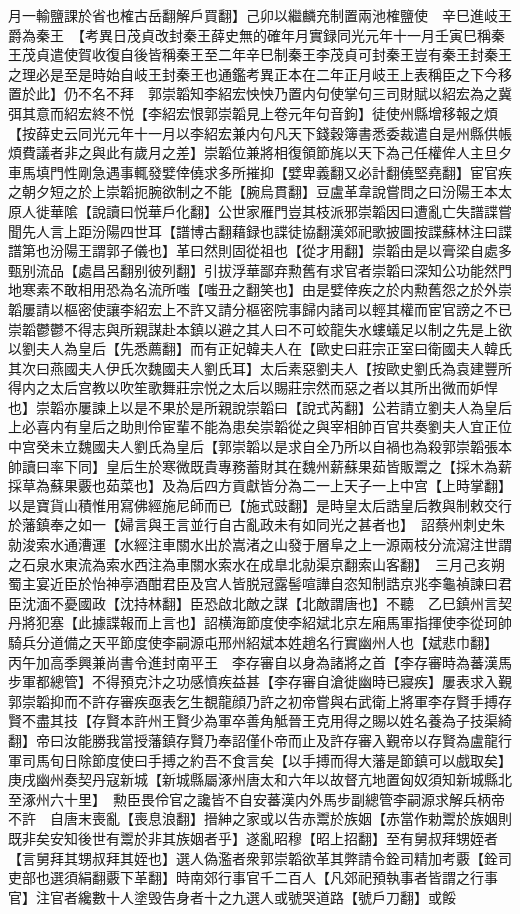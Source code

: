 月一輸鹽課於省也榷古岳翻解戶買翻】己卯以繼麟充制置兩池榷鹽使　辛巳進岐王爵為秦王　【考異日茂貞改封秦王薛史無的確年月實録同光元年十一月壬寅巳稱秦王茂貞遣使賀收復自後皆稱秦王至二年辛巳制秦王李茂貞可封秦王豈有秦王封秦王之理必是至是時始自岐王封秦王也通鑑考異正本在二年正月岐王上表稱臣之下今移置於此】仍不名不拜　郭崇韜知李紹宏怏怏乃置内句使掌句三司財賦以紹宏為之冀弭其意而紹宏終不悦【李紹宏恨郭崇韜見上卷元年句音鉤】徒使州縣增移報之煩【按薛史云同光元年十一月以李紹宏兼内句凡天下錢穀簿書悉委裁遣自是州縣供帳煩費議者非之與此有歲月之差】崇韜位兼將相復領節旄以天下為己任權侔人主旦夕車馬填門性剛急遇事輒發嬖倖僥求多所摧抑【嬖卑義翻又必計翻僥堅堯翻】宦官疾之朝夕短之於上崇韜扼腕欲制之不能【腕烏貫翻】豆盧革韋說嘗問之曰汾陽王本太原人徙華隂【說讀曰悦華戶化翻】公世家雁門豈其枝派邪崇韜因曰遭亂亡失譜諜嘗聞先人言上距汾陽四世耳【譜博古翻藉録也諜徒協翻漢郊祀歌披圖按諜蘇林注曰諜譜第也汾陽王謂郭子儀也】革曰然則固從祖也【從才用翻】崇韜由是以膏梁自處多甄别流品【處昌呂翻别彼列翻】引拔浮華鄙弃勲舊有求官者崇韜曰深知公功能然門地寒素不敢相用恐為名流所嗤【嗤丑之翻笑也】由是嬖倖疾之於内勲舊怨之於外崇韜屢請以樞密使讓李紹宏上不許又請分樞密院事歸内諸司以輕其權而宦官謗之不已崇韜鬱鬱不得志與所親謀赴本鎮以避之其人曰不可蛟龍失水螻蟻足以制之先是上欲以劉夫人為皇后【先悉薦翻】而有正妃韓夫人在【歐史曰莊宗正室曰衛國夫人韓氏其次曰燕國夫人伊氏次魏國夫人劉氏耳】太后素惡劉夫人【按歐史劉氏為袁建豐所得内之太后宫教以吹笙歌舞莊宗悦之太后以賜莊宗然而惡之者以其所出微而妒悍也】崇韜亦屢諫上以是不果於是所親說崇韜曰【說式芮翻】公若請立劉夫人為皇后上必喜内有皇后之助則伶宦輩不能為患矣崇韜從之與宰相帥百官共奏劉夫人宜正位中宫癸未立魏國夫人劉氏為皇后【郭崇韜以是求自全乃所以自禍也為殺郭崇韜張本帥讀曰率下同】皇后生於寒微既貴專務蓄財其在魏州薪蘇果茹皆販鬻之【採木為薪採草為蘇果覈也茹菜也】及為后四方貢獻皆分為二一上天子一上中宫【上時掌翻】以是寶貨山積惟用寫佛經施尼師而已【施式豉翻】是時皇太后誥皇后教與制敕交行於藩鎮奉之如一【婦言與王言並行自古亂政未有如同光之甚者也】　詔蔡州刺史朱勍浚索水通漕運【水經注車關水出於嵩渚之山發于層阜之上一源兩枝分流瀉注世謂之石泉水東流為索水西注為車關水索水在成臯北勍渠京翻索山客翻】　三月己亥朔蜀主宴近臣於怡神亭酒酣君臣及宫人皆脱冠露髻喧譁自恣知制誥京兆李龜禎諫曰君臣沈湎不憂國政【沈持林翻】臣恐啟北敵之謀【北敵謂唐也】不聽　乙巳鎮州言契丹將犯塞【此據諜報而上言也】詔横海節度使李紹斌北京左廂馬軍指揮使李從珂帥騎兵分道備之天平節度使李嗣源屯邢州紹斌本姓趙名行實幽州人也【斌悲巾翻】　丙午加高季興兼尚書令進封南平王　李存審自以身為諸將之首【李存審時為蕃漢馬步軍都總管】不得預克汴之功感憤疾益甚【李存審自滄徙幽時已寢疾】屢表求入覲郭崇韜抑而不許存審疾亟表乞生覩龍顔乃許之初帝嘗與右武衛上將軍李存賢手搏存賢不盡其技【存賢本許州王賢少為軍卒善角觝晉王克用得之賜以姓名養為子技渠綺翻】帝曰汝能勝我當授藩鎮存賢乃奉詔僅仆帝而止及許存審入覲帝以存賢為盧龍行軍司馬旬日除節度使曰手搏之約吾不食言矣【以手搏而得大藩是節鎮可以戲取矣】　庚戌幽州奏契丹寇新城【新城縣屬涿州唐太和六年以故督亢地置匈奴須知新城縣北至涿州六十里】　勲臣畏伶官之讒皆不自安蕃漢内外馬步副總管李嗣源求解兵柄帝不許　自唐末喪亂【喪息浪翻】搢紳之家或以告赤鬻於族姻【赤當作勅鬻於族姻則既非矣安知後世有鬻於非其族姻者乎】遂亂昭穆【昭上招翻】至有舅叔拜甥姪者【言舅拜其甥叔拜其姪也】選人偽濫者衆郭崇韜欲革其弊請令銓司精加考覈【銓司吏部也選須絹翻覈下革翻】時南郊行事官千二百人【凡郊祀預執事者皆謂之行事官】注官者纔數十人塗毁告身者十之九選人或號哭道路【號戶刀翻】或餒